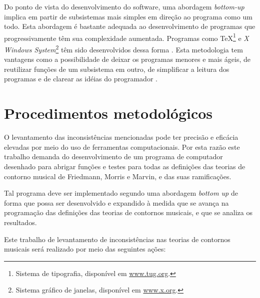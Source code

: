 \documentclass[12pt]{article}
\newcommand{\eng}[1]{\textit{#1}}
\begin{document}
Do ponto de vista do desenvolvimento do software, uma abordagem
\eng{bottom-up} implica em partir de subsistemas mais simples em
direção ao programa como um todo. Esta abordagem é bastante adequada
ao desenvolvimento de programas que progressivamente têm sua
complexidade aumentada. Programas como \TeX{}\footnote{Sistema de
  tipografia, disponível em \url{www.tug.org}.} e \eng{X Windows
  System}\footnote{Sistema gráfico de janelas, disponível em
  \url{www.x.org}.} têm sido desenvolvidos dessa forma
\cite[p. vi]{graham94:lisp}. Esta metodologia tem vantagens como a
possibilidade de deixar os programas menores e mais ágeis, de
reutilizar funções de um subsistema em outro, de simplificar a leitura
dos programas e de clarear as idéias do programador
\cite[p. 4]{graham94:lisp}.

\section{Procedimentos metodológicos}
\label{sec:metodologia}

O levantamento das inconsistências mencionadas pode ter precisão e
eficácia elevadas por meio do uso de ferramentas computacionais. Por
esta razão este trabalho demanda do desenvolvimento de um programa de
computador desenhado para abrigar funções e testes para todas as
definições das teorias de contorno musical de Friedmann, Morris e
Marvin, e das suas ramificações.

Tal programa deve ser implementado segundo uma abordagem \eng{bottom
  up} \cite{graham94:lisp} de forma que possa ser desenvolvido e
expandido à medida que se avança na programação das definições das
teorias de contornos musicais, e que se analiza os resultados.

Este trabalho de levantamento de inconsistências nas teorias de
contornos musicais será realizado por meio das seguintes ações:
\end{document}
